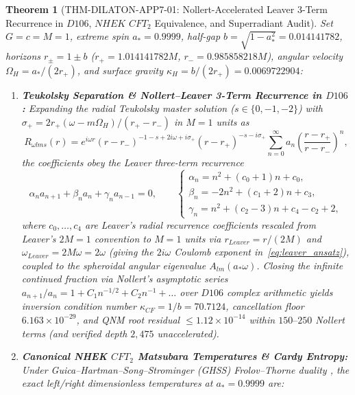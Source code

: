 \documentclass[11pt,a4paper,reqno]{article}
\def\texttt#1{#1}%
\def\mathrm#1{#1}%
\def\mathbb#1{#1}%
\def\Done{D106}%
\theoremstyle{plain}
\newtheorem{theorem}{Theorem}[section]
\theoremstyle{definition}
\theoremstyle{remark}
\numberwithin{equation}{section}
\numberwithin{table}{section}
\newcommand{\Done}{\mathbb{D}_{106}}
\begin{document}
\begin{theorem}[{\texttt{THM-DILATON-APP7-01}: Nollert-Accelerated Leaver 3-Term Recurrence in $\Done$, $\mathrm{NHEK}$ $\mathrm{CFT}_2$ Equivalence, and Superradiant Audit}]
\label{thm:dilaton_kerr}
Set $G = c = M = 1$, extreme spin $a_* = 0.9999$, half-gap $b = \sqrt{1 - a_*^2} = 0.014141782$, horizons $r_\pm = 1 \pm b$ ($r_+ = 1.014141782M$, $r_- = 0.985858218M$), angular velocity $\Omega_H = a_*/(2 r_+)$, and surface gravity $\kappa_H = b/(2 r_+) = 0.0069722904$:
\begin{enumerate}[label=(\roman*)]
  \item \textbf{Teukolsky Separation \& Nollert--Leaver 3-Term Recurrence in $\Done$:} Expanding the radial Teukolsky master solution ($s \in \{0,-1,-2\}$) with $\sigma_+ = 2 r_+ (\omega - m\Omega_H)/(r_+ - r_-)$ in $M=1$ units as
  \begin{equation}
    R_{\omega l m s}(r) = e^{i\omega r} (r - r_-)^{-1-s+2i\omega+i\sigma_+} (r - r_+)^{-s-i\sigma_+} \sum_{n=0}^{\infty} a_n \left(\frac{r - r_+}{r - r_-}\right)^n,
    \label{eq:leaver_ansatz}
  \end{equation}
  the coefficients obey the Leaver three-term recurrence \cite{Leaver1985}
  \begin{equation}
    \alpha_n a_{n+1} + \beta_n a_n + \gamma_n a_{n-1} = 0, \qquad
    \begin{cases}
      \alpha_n = n^2 + (c_0 + 1) n + c_0, \\
      \beta_n  = -2n^2 + (c_1 + 2) n + c_3, \\
      \gamma_n = n^2 + (c_2 - 3) n + c_4 - c_2 + 2,
    \end{cases}
    \label{eq:leaver_3term}
  \end{equation}
  where $c_0, \dots, c_4$ are Leaver's radial recurrence coefficients \cite{Leaver1985} rescaled from Leaver's $2M=1$ convention to $M=1$ units via $r_{\mathrm{Leaver}} = r/(2M)$ and $\omega_{\mathrm{Leaver}} = 2M\omega = 2\omega$ (giving the $2i\omega$ Coulomb exponent in~\eqref{eq:leaver_ansatz}), coupled to the spheroidal angular eigenvalue $A_{lm}(a_*\omega)$. Closing the infinite continued fraction via Nollert's asymptotic series $a_{n+1}/a_n = 1 + C_1 n^{-1/2} + C_2 n^{-1} + \dots$ over $\Done$ complex arithmetic \cite{Nollert1993} yields inversion condition number $\kappa_{\mathrm{CF}} = 1/b = 70.7124$, cancellation floor $6.163 \times 10^{-29}$, and QNM root residual $\le 1.12 \times 10^{-14}$ within $150\text{--}250$ Nollert terms (and verified depth $2{,}475$ unaccelerated).
  \item \textbf{Canonical NHEK $\mathrm{CFT}_2$ Matsubara Temperatures \& Cardy Entropy:} Under Guica--Hartman--Song--Strominger (GHSS) Frolov--Thorne duality \cite{GHSS2009}, the exact left/right dimensionless temperatures at $a_* = 0.9999$ are:

\end{enumerate}
\end{theorem}
\end{document}
